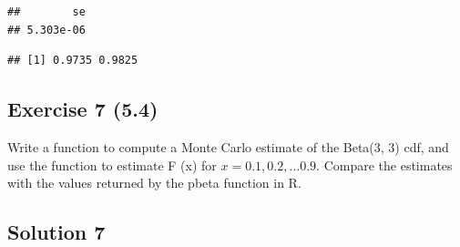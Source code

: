 \documentclass[
]{article}
\newenvironment{Shaded}{\begin{snugshade}}{\end{snugshade}}
\newcommand{\CommentTok}[1]{\textcolor[rgb]{0.56,0.35,0.01}{\textit{#1}}}
\newcommand{\DataTypeTok}[1]{\textcolor[rgb]{0.13,0.29,0.53}{#1}}
\newcommand{\DecValTok}[1]{\textcolor[rgb]{0.00,0.00,0.81}{#1}}
\newcommand{\FloatTok}[1]{\textcolor[rgb]{0.00,0.00,0.81}{#1}}
\newcommand{\KeywordTok}[1]{\textcolor[rgb]{0.13,0.29,0.53}{\textbf{#1}}}
\newcommand{\NormalTok}[1]{#1}
\newcommand{\OperatorTok}[1]{\textcolor[rgb]{0.81,0.36,0.00}{\textbf{#1}}}
\begin{document}
\begin{verbatim}
##        se 
## 5.303e-06
\end{verbatim}

\begin{Shaded}
\end{Shaded}

\begin{verbatim}
## [1] 0.9735 0.9825
\end{verbatim}

\hypertarget{exercise-7-5.4}{%
\subsection{Exercise 7 (5.4)}\label{exercise-7-5.4}}

Write a function to compute a Monte Carlo estimate of the Beta(3, 3)
cdf, and use the function to estimate F (x) for
\(x = 0.1,0.2,\ldots 0.9\). Compare the estimates with the values
returned by the pbeta function in R.

\hypertarget{solution-7}{%
\subsection{Solution 7}\label{solution-7}}
\end{document}
